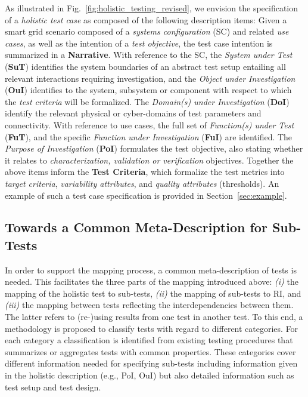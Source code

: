 As illustrated in Fig.~\ref{fig:holistic_testing_revised}, we envision the specification of a \emph{holistic test case} as composed of the following description items: 
Given a smart grid scenario composed of a \emph{systems configuration} (SC) and related \emph{use cases}, as well as the intention of a \emph{test objective}, the test case intention is summarized in a  \textbf{Narrative}.
With reference to the SC, the \emph{System under Test} (\textbf{SuT}) identifies the system boundaries of an abstract test setup entailing all relevant interactions requiring investigation, and the \emph{Object under Investigation} (\textbf{OuI}) identifies to the system, subsystem or component%
 with respect to which the \emph{test criteria} will be formalized. 
The \emph{Domain(s) under Investigation} (\textbf{DoI}) identify the relevant physical or cyber-domains of test parameters and connectivity. 
With reference to use cases, the full set of \emph{Function(s) under Test} (\textbf{FuT}), and the specific \emph{Function under Investigation}  (\textbf{FuI}) are identified. 
The \emph{Purpose of Investigation} (\textbf{PoI}) formulates the test objective, also stating whether it relates to \emph{characterization, validation or verification} objectives. 
Together the above items inform the 
\textbf{Test Criteria}, which formalize the test metrics into \emph{target criteria}, \emph{variability attributes}, and \emph{quality attributes} (thresholds). 
An example of such a test case specification is provided in Section~\ref{sec:example}.

\subsection{Towards a Common Meta-Description for Sub-Tests}\label{sec:common_meta-description}

In order to support the mapping process, a common meta-description of tests is needed. This facilitates the three parts of the mapping introduced above: 
\emph{(i)} the mapping of the holistic test to sub-tests,
\emph{(ii)} the mapping of sub-tests to RI, and
\emph{(iii)} the mapping between tests reflecting the interdependencies between them. The latter refers to (re-)using results from one test in another test.
To this end, a methodology is proposed to classify tests with regard to different categories. %
For each category a classification is identified from existing testing procedures that summarizes or aggregates tests with common properties.
These categories cover different information needed for specifying sub-tests including information given in the holistic description (e.g., PoI, OuI) but also detailed information such as test setup and test design.

